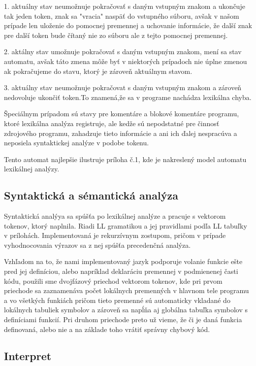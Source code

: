 \documentclass[12pt,a4paper,titlepage,final]{article}
\begin{document}
1. aktuálny stav neumožnuje pokračovať s daným vstupným znakom a ukončuje tak
jeden token, znak sa "vracia" naspäť do vstupného súboru, avšak v našom prípade
len uloženie do pomocnej premennej a uchovanie informácie, že další znak pre
další token bude čítaný nie zo súboru ale z tejto pomocnej premennej.

2. aktálny stav umožnuje pokračovať s daným vstupným znakom, mení sa stav automatu,
avšak táto zmena môže byť v niektorých prípadoch nie úplne zmenou ak pokračujeme
do stavu, ktorý je zároveň aktuálnym stavom.

3. aktuálny stav neumožnuje pokračovat s daným vstupným znakom a zároveň
nedovoluje ukončiť token.To znamená,že sa v programe nachádza lexikálna chyba.

Špeciálnym prípadom sú stavy pre komentáre a blokové komentáre programu, ktoré
lexikálna analýza registruje, ale kedže sú nepodstatné pre činnosť zdrojového
programu, zahadzuje tieto informácie a ani ich ďalej nespracúva a neposiela
syntaktickej analýze v podobe tokenu.

Tento automat najlepšie ilustruje príloha č.1, kde je nakreslený model
automatu lexikálnej analýzy.

\subsection{Syntaktická a sémantická analýza}
Syntaktická analýya sa spúšťa po lexikálnej analýze a pracuje s vektorom tokenov,
ktorý naplnila. Riadi LL gramatikou a jej pravidlami podľa LL tabuľky v prílohách.
Implementovaná je rekurzívnym zostupom, pričom v prípade vyhodnocovania výrazov sa
z nej spúšťa precedenčná analýza.

Vzhľadom na to, že nami implementovaný jazyk podporuje volanie funkcie ešte pred
jej definíciou, alebo napríklad deklaráciu premennej v podmienenej časti kódu,
použili sme dvojfázový priechod vektorom tokenov, kde pri prvom priechode sa zaznamenáva počet
lokálnych premenných v hlavnom tele programu a vo všetkých funkiách pričom tieto premenné
sú automaticky vkladané do lokálnych tabuliek symbolov a zároveň sa napĺňa aj globálna
tabuľka symbolov s definíciami funkcií. Pri druhom priechode preto už vieme, že či je daná funkcia
definovaná, alebo nie a na základe toho vrátiť správny chybový kód.

\subsection{Interpret}
\end{document}
